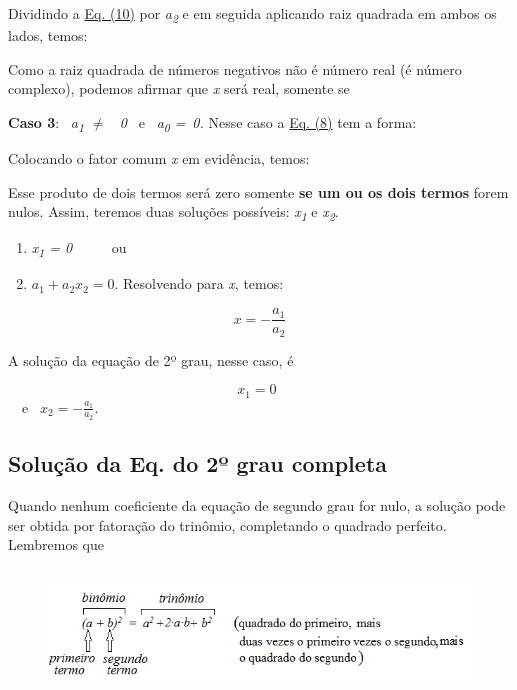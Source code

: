 
Dividindo a \hyperref[eqc:4.10]{Eq. (10)} por \textit{a\textsubscript{2}} e em seguida aplicando raiz quadrada em ambos os lados, temos:


Como a raiz quadrada de números negativos não é número real (é número complexo), podemos afirmar que \textit{x} será real, somente se


\textbf{Caso 3}:~ \textit{a\textsubscript{1 }$ \neq $ ~0~  }e~ \textit{a\textsubscript{0}} \textit{=~0. }Nesse caso a \hyperref[eqc:4.8]{Eq. (8)} tem a forma:


Colocando o fator comum \textit{x} em evidência, temos:


Esse produto de dois termos será zero somente \textbf{se um ou os dois termos} forem nulos. Assim, teremos duas soluções possíveis: \textit{x\textsubscript{1}} e \textit{x\textsubscript{2}}.

\begin{enumerate}
	\item \textit{x\textsubscript{1} = 0}~~~~~ ou

	\item  \( a_{1}+a_{2}x_{2} =0 \). Resolvendo para \textit{x}, temos:
\end{enumerate}

 \[  \]  \[ x =-\frac{a_{1}}{a_{2}} \]

A solução da equação de 2º grau, nesse caso, é

 \[ x_{1}=0~~  \] ~~e~   \(   x_{2}=-\frac{a_{1}}{a_{2}} \). \qedsymbol{}

\subsection{Solução da Eq. do 2º grau completa}

Quando nenhum coeficiente da equação de segundo grau for nulo, a solução pode ser obtida por fatoração do trinômio, completando o quadrado perfeito. Lembremos que

\begin{figure}[H]
	\begin{Center}
		\includegraphics[width=5.91in,height=1.35in]{capitulos/equacoes_de_primeiro_e_segundo_grau/media/image2.png}
	\end{Center}
\end{figure}

